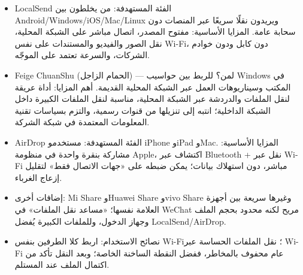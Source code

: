 
\begin{itemize}
  \item LocalSend الفئة المستهدفة: من يخلطون بين Android/Windows/iOS/Mac/Linux ويريدون نقلًا سريعًا عبر المنصات دون سحابة عامة. المزايا الأساسية: مفتوح المصدر، اتصال مباشر على الشبكة المحلية، نقل الصور والفيديو والمستندات على نفس Wi-Fi، دون كابل ودون خوادم الشركات، والسرعة تعتمد على الموجّه.
  \item Feige ChuanShu (الحمام الزاجل) — لمن؟ للربط بين حواسيب Windows في المكتب وسيناريوهات العمل عبر الشبكة المحلية القديمة. أهم المزايا: أداة عريقة لنقل الملفات والدردشة عبر الشبكة المحلية، مناسبة لنقل الملفات الكبيرة داخل الشبكة الداخلية؛ انتبه إلى تنزيلها من قنوات رسمية، والتزم بسياسات تقنية المعلومات المعتمدة في شبكة الشركة.
  \item AirDrop الفئة المستهدفة: مستخدمو iPhone وiPad وMac. المزايا الأساسية: مشاركة بنقرة واحدة في منظومة Apple، اكتشاف عبر Bluetooth + نقل عبر Wi-Fi مباشر، دون استهلاك بيانات؛ يمكن ضبطه على «جهات الاتصال فقط» لتقليل إزعاج الغرباء.
  \item إضافات أخرى: Mi Share وHuawei Share وvivo Share وغيرها سريعة بين أجهزة العلامة نفسها؛ «مساعد نقل الملفات» في WeChat مريح لكنه محدود بحجم الملف وجهاز الدخول، وللملفات الكبيرة يُفضل LocalSend/AirDrop.
  \item نصائح الاستخدام: اربط كلا الطرفين بنفس Wi-Fi؛ نقل الملفات الحساسة عبر Wi-Fi عام محفوف بالمخاطر، ففضل النقطة الساخنة الخاصة؛ وبعد النقل تأكد من اكتمال الملف عند المستلم.
\end{itemize}


